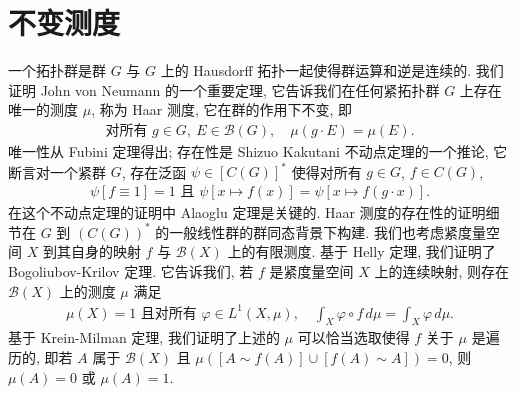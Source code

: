 \documentclass[../main.tex]{subfiles}
\begin{document}
\chapter{不变测度}\label{chapter:ch22-不变测度}

一个拓扑群是群 $G$ 与 $G$ 上的 Hausdorff 拓扑一起使得群运算和逆是连续的. 我们证明 John von Neumann 的一个重要定理, 它告诉我们在任何紧拓扑群 $G$ 上存在唯一的测度 $\mu$, 称为 Haar 测度, 它在群的作用下不变, 即
\begin{align*}
\text{对所有 }g\in G,\ E\in\mathcal{B}(G),\quad\mu(g\cdot E)=\mu(E).
\end{align*}
唯一性从 Fubini 定理得出; 存在性是 Shizuo Kakutani 不动点定理的一个推论, 它断言对一个紧群 $G$, 存在泛函 $\psi\in[C(G)]^{*}$ 使得对所有 $g\in G$, $f\in C(G)$,
\begin{align*}
\psi[f\equiv 1]=1\text{ 且 }\psi[x\mapsto f(x)]=\psi[x\mapsto f(g\cdot x)].
\end{align*}
在这个不动点定理的证明中 Alaoglu 定理是关键的. Haar 测度的存在性的证明细节在 $G$ 到 $(C(G))^{*}$ 的一般线性群的群同态背景下构建. 我们也考虑紧度量空间 $X$ 到其自身的映射 $f$ 与 $\mathcal{B}(X)$ 上的有限测度. 基于 Helly 定理, 我们证明了 Bogoliubov-Krilov 定理. 它告诉我们, 若 $f$ 是紧度量空间 $X$ 上的连续映射, 则存在 $\mathcal{B}(X)$ 上的测度 $\mu$ 满足
\begin{align*}
\mu(X)=1\text{ 且对所有 }\varphi\in L^{1}(X,\mu),\quad\int_{X}\varphi\circ f\,d\mu=\int_{X}\varphi\,d\mu.
\end{align*}
基于 Krein-Milman 定理, 我们证明了上述的 $\mu$ 可以恰当选取使得 $f$ 关于 $\mu$ 是遍历的, 即若 $A$ 属于 $\mathcal{B}(X)$ 且 $\mu([A\sim f(A)]\cup[f(A)\sim A])=0$, 则 $\mu(A)=0$ 或 $\mu(A)=1$.





\end{document}
